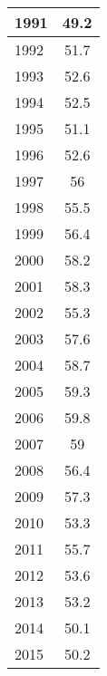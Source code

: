 \documentclass{mcmthesis}
\begin{document}
\begin{appendices}
\begin{minipage}{\textwidth}
\begin{minipage}[t]{0.45\textwidth}
\begin{tabular}{|l|c|}
            1991 & 49.2                       \\ \hline
            1992 & 51.7                       \\ \hline
            1993 & 52.6                       \\ \hline
            1994 & 52.5                       \\ \hline
            1995 & 51.1                       \\ \hline
            1996 & 52.6                       \\ \hline
            1997 & 56                         \\ \hline
            1998 & 55.5                       \\ \hline
            1999 & 56.4                       \\ \hline
            2000 & 58.2                       \\ \hline
            2001 & 58.3                       \\ \hline
            2002 & 55.3                       \\ \hline
            2003 & 57.6                       \\ \hline
            2004 & 58.7                       \\ \hline
            2005 & 59.3                       \\ \hline
            2006 & 59.8                       \\ \hline
            2007 & 59                         \\ \hline
            2008 & 56.4                       \\ \hline
            2009 & 57.3                       \\ \hline
            2010 & 53.3                       \\ \hline
            2011 & 55.7                       \\ \hline
            2012 & 53.6                       \\ \hline
            2013 & 53.2                       \\ \hline
            2014 & 50.1                       \\ \hline
            2015 & 50.2                       \\ \hline
            \end{tabular}
  \end{minipage}
\end{minipage}


\end{appendices}
\end{document}
